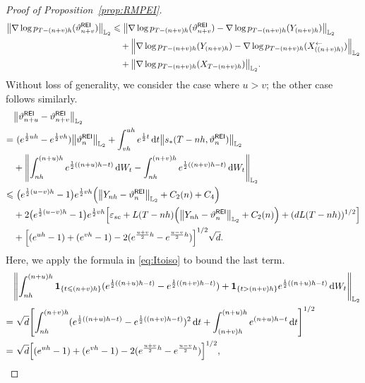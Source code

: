 \begin{proof}[Proof of Proposition~\ref{prop:RMPEI}]
\begin{align*}
    \left\lVert\nabla\log p_{T-(n+v)h}(\vartheta_{n+v}^{\sf REI})\right\rVert_{\Ltwo}
    &\leqslant \left\lVert\nabla\log p_{T-(n+v)h}(\vartheta_{n+v}^{\sf REI})-\nabla\log p_{T-(n+v)h}(Y_{(n+v)h})\right\rVert_{\Ltwo}\\
    &\quad+\l|\nabla\log p_{T-(n+v)h}(Y_{(n+v)h})-\nabla\log p_{T-(n+v)h}(X_{((n+v)h)}^{\leftarrow})\r|_{\Ltwo}\\
    &\quad +\l|\nabla\log p_{T-(n+v)h}(X_{T-(n+v)h})\r|_{\Ltwo}.
\end{align*}
Without loss of generality, we consider the case where $u>v$; the other case follows similarly.
\begin{equation}
    \begin{aligned}
        &\l|\vartheta_{n+u}^{\sf REI}-\vartheta_{n+v}^{\sf REI}\r|_{\Ltwo}\\
        =&\,\,(e^{\frac{1}{2}uh}-e^{\frac{1}{2}vh})\l|\vartheta_n^{\sf REI}\r|_{\Ltwo}+\int_{vh}^{uh}e^{\frac{1}{2}t}\rmd t\l|s_*(T-nh,\vartheta_n^{\sf REI})\r|_{\Ltwo}\\
        &+\left\lVert\int_{nh}^{(n+u)h}e^{\frac{1}{2}((n+u)h-t)}\rmd W_t-\int_{nh}^{(n+v)h}e^{\frac{1}{2}((n+v)h-t)}\rmd W_t\right\rVert_{\Ltwo}\\
        \leqslant& \,\,\big(e^{\frac{1}{2}(u-v)h}-1\big)e^{\frac{1}{2}vh}\left(\l|Y_{nh}-\vartheta_n^{\sf REI}\r|_{\Ltwo}+C_2(n)+C_4\right)\\
        &+2\big(e^{\frac{1}{2}(u-v)h}-1\big)e^{\frac{1}{2}vh}\left[\varepsilon_{sc}+L(T-nh)\left(\l|Y_{nh}-\vartheta_n^{\sf REI}\r|_{\Ltwo}+C_2(n)\right)+(dL(T-nh))^{1/2}\right]\\
        &+\left[(e^{uh}-1)+(e^{vh}-1)-2(e^{\frac{u+v}{2}h}-e^{\frac{u-v}{2}h})\right]^{1/2}\sqrt{d}.
    \end{aligned}
    \label{eq:yEIdiff}
\end{equation}
Here, we apply the formula in \eqref{eq:Itoiso} to bound the last term.
\begin{align*}
    &\left\lVert\int_{nh}^{(n+u)h}\textbf{1}_{\{t\leqslant(n+v)h\}}(e^{\frac{1}{2}((n+u)h-t)}-e^{\frac{1}{2}((n+v)h-t)})+\textbf{1}_{\{t>(n+v)h\}}e^{\frac{1}{2}((n+u)h-t)}\rmd W_t\right\rVert_{\Ltwo}\\
    =&\,\,\sqrt{d}\left[\int_{nh}^{(n+v)h}(e^{\frac{1}{2}((n+u)h-t)}-e^{\frac{1}{2}((n+v)h-t)})^2\rmd t+\int_{(n+v)h}^{(n+u)h}e^{(n+u)h-t}\rmd t\right]^{1/2}\\
    =&\,\,\sqrt{d}\left[(e^{uh}-1)+(e^{vh}-1)-2(e^{\frac{u+v}{2}h}-e^{\frac{u-v}{2}h})\right]^{1/2},

\end{align*}
\end{proof}
